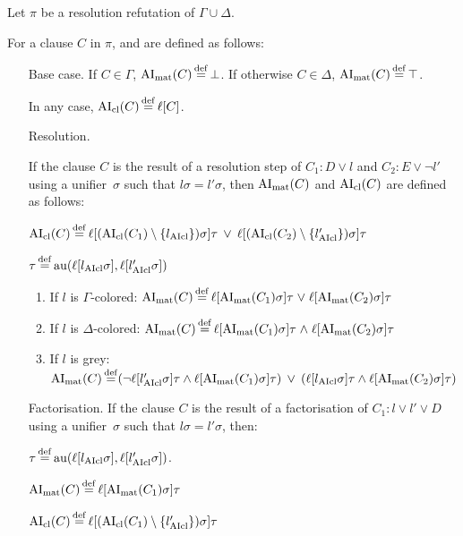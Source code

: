 \documentclass[,%
	paper=a4,%
	DIV10, 
	twoside=false,%
	liststotoc,
	bibtotoc,
	draft=false,%
	numbers=noendperiod
]{scrartcl}
\begin{document}
\begin{defi}
	Let $\pi$ be a resolution refutation of $\Gamma \cup \Delta$.

	For a clause $C$ in $\pi$,  and  are defined as follows:
	\begin{itemize}
		\item[Base case.]
			If $C \in \Gamma$, $\operatorname{AI}_\mathrm{mat}(C) \operatorname{\stackrel{\mathrm{def}}{=}} \bot$.
			If otherwise $C \in \Delta$, $\operatorname{AI}_\mathrm{mat}(C) \operatorname{\stackrel{\mathrm{def}}{=}} \top$.

			In any case, $\operatorname{AI}_\mathrm{cl}(C) \operatorname{\stackrel{\mathrm{def}}{=}} \ell[C]$.
		\item[Resolution.]

			If the clause $C$ is the result of a resolution step of $C_1: D \lor l$ and $C_2: E \lor \lnot l'$ using a unifier~$\sigma$ such that $l\sigma = l'\sigma$, then $\operatorname{AI}_\mathrm{mat}(C)$ and $\operatorname{AI}_\mathrm{cl}(C)$ are defined as follows:

			$\operatorname{AI}_\mathrm{cl}(C) \operatorname{\stackrel{\mathrm{def}}{=}} \ell[(\operatorname{AI}_\mathrm{cl}(C_1) \setminus \{l_{\operatorname{AIcl}}\})\sigma]\tau \;\,{\lor}\;\, \ell[(\operatorname{AI}_\mathrm{cl}(C_2)\setminus \{l_{\operatorname{AIcl}}'\})\sigma]\tau $

			$\tau \operatorname{\stackrel{\mathrm{def}}{=}} \operatorname{au}(\ell[l_{\operatorname{AIcl}}\sigma], \ell[l'_{\operatorname{AIcl}}\sigma])$
			\begin{enumerate}

				\item If $l$ is $\Gamma$-colored:
					$\operatorname{AI}_\mathrm{mat}(C) \operatorname{\stackrel{\mathrm{def}}{=}} \ell[\operatorname{AI}_\mathrm{mat}(C_1)\sigma]\tau\;{\lor}\; \ell[\operatorname{AI}_\mathrm{mat}(C_2)\sigma]\tau $

				\item If $l$ is $\Delta$-colored:
					$\operatorname{AI}_\mathrm{mat}(C) \operatorname{\stackrel{\mathrm{def}}{=}} \ell[\operatorname{AI}_\mathrm{mat}(C_1)\sigma]\tau\;{\land}\; \ell[\operatorname{AI}_\mathrm{mat}(C_2)\sigma]\tau $

				\item If $l$ is grey:
					$\operatorname{AI}_\mathrm{mat}(C) \operatorname{\stackrel{\mathrm{def}}{=}}
					(\lnot {\ell[l'\ensuremath{_{\operatorname{AIcl}}}\sigma]}\tau \land \ell[\operatorname{AI}_\mathrm{mat}(C_1)\sigma]\tau) \;\,{\lor}\;\,
					(\ell[l_{\operatorname{AIcl}}\sigma]\tau \land \ell[\operatorname{AI}_\mathrm{mat}(C_2)\sigma]\tau)
					$

			\end{enumerate}

		\item[Factorisation.]
			If the clause $C$ is the result of a factorisation of $C_1: l \lor l' \lor D$ using a unifier~$\sigma$ such that $l\sigma = l'\sigma$, then:

			$\tau \operatorname{\stackrel{\mathrm{def}}{=}} \operatorname{au}(\ell[l_{\operatorname{AIcl}}\sigma], \ell[l'_{\operatorname{AIcl}}\sigma])$.

			$\operatorname{AI}_\mathrm{mat}(C) \operatorname{\stackrel{\mathrm{def}}{=}}{} \ell[\operatorname{AI}_\mathrm{mat}(C_1)\sigma]\tau$

			$\AIcl(C) \defeq \lifboth{ (\AIclause(C_1) \setminus\nolinebreak \{l'\cl\})\sigma}\tau$
			\qedhere

	\end{itemize}
\end{defi}


\label{sec:arrow_quantifier_block} 
\end{document}
